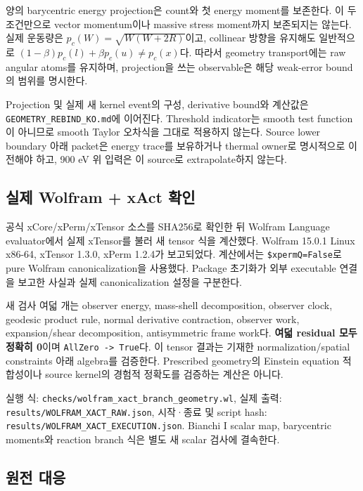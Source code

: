 \documentclass[11pt,a4paper]{article}
\begin{document}
양의 barycentric energy projection은 count와 첫 energy moment를 보존한다. 이 두 조건만으로 vector momentum이나 massive stress moment까지 보존되지는 않는다. 실제 운동량은 \(p_c(W)=\sqrt{W(W+2R)}\)이고, collinear 방향을 유지해도 일반적으로 \((1-\beta)p_c(l)+\beta p_c(u)\ne p_c(x)\)다. 따라서 geometry transport에는 raw angular atoms를 유지하며, projection을 쓰는 observable은 해당 weak-error bound의 범위를 명시한다.

Projection 및 실제 새 kernel event의 구성, derivative bound와 계산값은 \texttt{GEOMETRY\_REBIND\_KO.md}에 이어진다. Threshold indicator는 smooth test function이 아니므로 smooth Taylor 오차식을 그대로 적용하지 않는다. Source lower boundary 아래 packet은 energy trace를 보유하거나 thermal owner로 명시적으로 이전해야 하고, 900 eV 위 입력은 이 source로 extrapolate하지 않는다.

\hypertarget{uxc2e4uxc81c-wolfram-xact-uxd655uxc778}{%
\subsection{실제 Wolfram + xAct 확인}\label{uxc2e4uxc81c-wolfram-xact-uxd655uxc778}}

공식 xCore/xPerm/xTensor 소스를 SHA256로 확인한 뒤 Wolfram Language evaluator에서 실제 xTensor를 불러 새 tensor 식을 계산했다. Wolfram 15.0.1 Linux x86-64, xTensor 1.3.0, xPerm 1.2.4가 보고되었다. 계산에서는 \texttt{\$xpermQ=False}로 pure Wolfram canonicalization을 사용했다. Package 초기화가 외부 executable 연결을 보고한 사실과 실제 canonicalization 설정을 구분한다.

새 검사 여덟 개는 observer energy, mass-shell decomposition, observer clock, geodesic product rule, normal derivative contraction, observer work, expansion/shear decomposition, antisymmetric frame work다. \textbf{여덟 residual 모두 정확히 0}이며 \texttt{AllZero\ -\textgreater{}\ True}다. 이 tensor 결과는 기재한 normalization/spatial constraints 아래 algebra를 검증한다. Prescribed geometry의 Einstein equation 적합성이나 source kernel의 경험적 정확도를 검증하는 계산은 아니다.

실행 식: \nolinkurl{checks/wolfram_xact_branch_geometry.wl}, 실제 출력: \nolinkurl{results/WOLFRAM_XACT_RAW.json}, 시작·종료 및 script hash: \nolinkurl{results/WOLFRAM_XACT_EXECUTION.json}. Bianchi I scalar map, barycentric moments와 reaction branch 식은 별도 새 scalar 검사에 결속한다.

\hypertarget{uxc6d0uxc804-uxb300uxc751}{%
\subsection{원전 대응}\label{uxc6d0uxc804-uxb300uxc751}}
\end{document}
